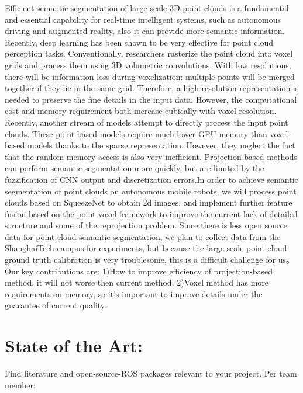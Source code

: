 \documentclass{article}
\begin{document}
\begin{normalsize}
        Efficient semantic segmentation of large-scale 3D point clouds is a fundamental and essential capability for real-time intelligent systems, such as autonomous driving and augmented reality, also it can provide more semantic information. Recently, deep learning has been shown to be very effective for point cloud perception tasks. Conventionally, researchers rasterize the point cloud into voxel grids and process them using 3D volumetric convolutions. With low resolutions, there will be information loss during voxelization: multiple points will be merged together if they lie in the same grid. Therefore, a high-resolution representation is needed to preserve the fine details in the input data. However, the computational cost and memory requirement both increase cubically with voxel resolution. Recently, another stream of models attempt to directly process the input point clouds. These point-based models require much lower GPU memory than voxel-based models thanks to the sparse representation. However, they neglect the fact that the random memory access is also very inefficient. Projection-based methods can perform semantic segmentation more quickly, but are limited by the fuzzification of CNN output and discretization errors.In order to achieve semantic segmentation of point clouds on autonomous mobile robots, we will process point clouds based on SqueezeNet to obtain 2d images, and implement further feature fusion based on the point-voxel framework to improve the current lack of detailed structure and some of the reprojection problem. Since there is less open source data for point cloud semantic segmentation, we plan to collect data from the ShanghaiTech campus for experiments, but because the large-scale point cloud ground truth calibration is very troublesome, this is a difficult challenge for us。\\
        Our key contributions are: 1)How to improve efficiency of projection-based method, it will not worse then current method. 2)Voxel method has more requirements on memory, so it’s important to improve details under the guarantee of current quality.
        
	   	\section{State of the Art:}
        
      Find literature and open-source-ROS packages relevant to your project. Per team member:
       
\begin{itemize}
   

\end{itemize}
\end{normalsize}
\end{document}
